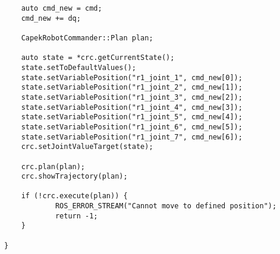 \begin{lstlisting}
	auto cmd_new = cmd;
	cmd_new += dq;

	CapekRobotCommander::Plan plan;

	auto state = *crc.getCurrentState();
	state.setToDefaultValues();
	state.setVariablePosition("r1_joint_1", cmd_new[0]);
	state.setVariablePosition("r1_joint_2", cmd_new[1]);
	state.setVariablePosition("r1_joint_3", cmd_new[2]);
	state.setVariablePosition("r1_joint_4", cmd_new[3]);
	state.setVariablePosition("r1_joint_5", cmd_new[4]);
	state.setVariablePosition("r1_joint_6", cmd_new[5]);
	state.setVariablePosition("r1_joint_7", cmd_new[6]);
	crc.setJointValueTarget(state);

	crc.plan(plan);
	crc.showTrajectory(plan);

	if (!crc.execute(plan)) {
		    ROS_ERROR_STREAM("Cannot move to defined position");
		    return -1;
	}
	
}
\end{lstlisting}
